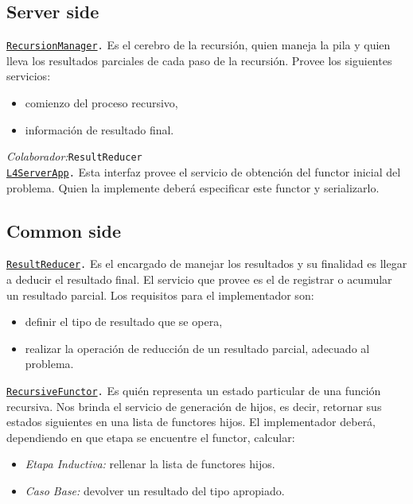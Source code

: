 \documentclass[a4paper,12pt,twoside]{article}
\begin{document}
    \subsection{Server side}
    
        \texttt{\underline{RecursionManager}.}
        Es el cerebro de la recursión, quien maneja la pila y quien lleva los resultados parciales de cada paso de la recursión. 
        Provee los siguientes servicios:
        \begin{itemize}
         \item comienzo del proceso recursivo,
         \item información de resultado final.
        \end{itemize}

        \textit{Colaborador:}\texttt{ResultReducer} \\
    
        \texttt{\underline{L4ServerApp}.}
        Esta interfaz provee el servicio de obtención del functor inicial del problema. Quien la implemente deberá 
        especificar este functor y serializarlo.

    \subsection{Common side}
        
        \texttt{\underline{ResultReducer}.}
        Es el encargado de manejar los resultados y su finalidad es llegar a deducir el resultado final. El servicio que provee es el 
        de registrar o acumular un resultado parcial. Los requisitos para el implementador son:
        \begin{itemize}
         \item definir el tipo de resultado que se opera,
         \item realizar la operación de reducción de un resultado parcial, adecuado al problema.
        \end{itemize}

        \texttt{\underline{RecursiveFunctor}.}
        Es quién representa un estado particular de una función recursiva. Nos brinda el servicio de generación de hijos, es decir, 
        retornar sus estados siguientes en una lista de functores hijos. El implementador deberá, dependiendo en que etapa se 
        encuentre el functor, calcular:
        \begin{itemize}
         \item \textit{Etapa Inductiva:} rellenar la lista de functores hijos.
         \item \textit{Caso Base:} devolver un resultado del tipo apropiado.
        \end{itemize}
\end{document}
